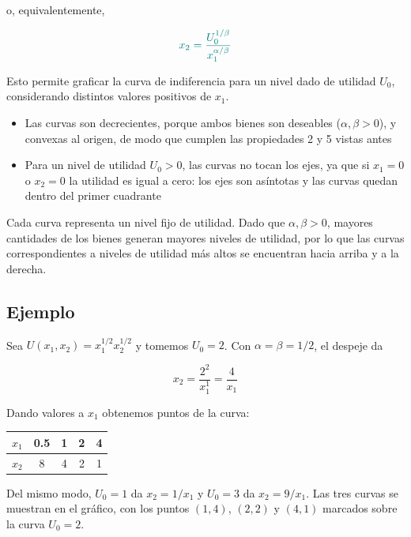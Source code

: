 \documentclass{article}
\begin{document}
o, equivalentemente,

\[
{\color{teal}
x_2=
\frac{U_0^{1/\beta}}{x_1^{\alpha/\beta}}
}
\]

Esto permite graficar la curva de indiferencia para un nivel dado de utilidad \(U_0\), considerando distintos valores positivos de \(x_1\).

\begin{itemize}
    \item Las curvas son {\color{teal}decrecientes}, porque ambos bienes son deseables (\(\alpha,\beta>0\)), y {\color{teal}convexas al origen}, de modo que cumplen las propiedades 2 y 5 vistas antes

    \item Para un nivel de utilidad {\color{teal}\(U_0>0\)}, las curvas {\color{teal}no tocan los ejes}, ya que si \(x_1=0\) o \(x_2=0\) la utilidad es igual a cero: los ejes son asíntotas y las curvas quedan dentro del primer cuadrante
\end{itemize}

Cada curva representa un {\color{teal}nivel fijo de utilidad}. Dado que \(\alpha,\beta>0\), mayores cantidades de los bienes generan mayores niveles de utilidad, por lo que las curvas correspondientes a niveles de utilidad más altos se encuentran hacia arriba y a la derecha.

\subsection*{Ejemplo}

Sea \(U(x_1,x_2)=x_1^{1/2}x_2^{1/2}\) y tomemos \(U_0=2\). Con \(\alpha=\beta=1/2\), el despeje da

\[
x_2=\frac{2^{2}}{x_1^{1}}=\frac{4}{x_1}
\]

Dando valores a \(x_1\) obtenemos puntos de la curva:

\begin{center}
\begin{tabular}{c|cccc}
\(x_1\) & 0.5 & 1 & 2 & 4\\ \hline
\(x_2\) & 8 & 4 & 2 & 1
\end{tabular}
\end{center}

Del mismo modo, \(U_0=1\) da \(x_2=1/x_1\) y \(U_0=3\) da \(x_2=9/x_1\). Las tres curvas se muestran en el gráfico, con los puntos \((1,4)\), \((2,2)\) y \((4,1)\) marcados sobre la curva \(U_0=2\).
\end{document}
